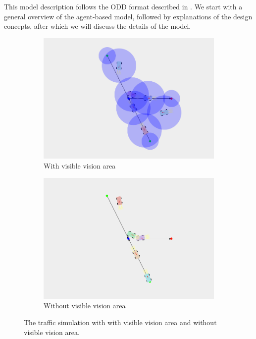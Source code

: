 
This model description follows the ODD format described in \textcite{grimm2006standard}. We start with a general overview of the agent-based model, followed by explanations of the design concepts, after which we will discuss the details of the model. 

\begin{figure}
	\centering
	\begin{subfigure}{0.49\textwidth}
		\centering
		\includegraphics[width=\textwidth]{./img/simulationView1}
		\caption{With visible vision area}
		\label{fig:model:simulation:fix}
	\end{subfigure}
	\begin{subfigure}{0.49\textwidth}
		\centering
		\includegraphics[width=\textwidth]{./img/simulationView2}
		\caption{Without visible vision area}
		\label{fig:model:simulation:nofix}
	\end{subfigure}	
	\caption{The traffic simulation with  with visible vision area and  without visible vision area.}
	\label{fig:model:simulation}
\end{figure}

